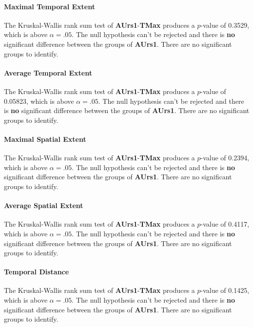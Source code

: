 \paragraph{Maximal Temporal Extent}
The Kruskal-Wallis rank sum test of \textbf{AUrs1}-\textbf{TMax} produces a $p$-value of 0.3529, which is above $\alpha=.05$. The null hypothesis can't be rejected and there is \textbf{no} significant difference between the groups of \textbf{AUrs1}. There are no significant groups to identify.

\paragraph{Average Temporal Extent}
The Kruskal-Wallis rank sum test of \textbf{AUrs1}-\textbf{TMax} produces a $p$-value of 0.05823, which is above $\alpha=.05$. The null hypothesis can't be rejected and there is \textbf{no} significant difference between the groups of \textbf{AUrs1}. There are no significant groups to identify.

\paragraph{Maximal Spatial Extent}
The Kruskal-Wallis rank sum test of \textbf{AUrs1}-\textbf{TMax} produces a $p$-value of 0.2394, which is above $\alpha=.05$. The null hypothesis can't be rejected and there is \textbf{no} significant difference between the groups of \textbf{AUrs1}. There are no significant groups to identify.

\paragraph{Average Spatial Extent}
The Kruskal-Wallis rank sum test of \textbf{AUrs1}-\textbf{TMax} produces a $p$-value of 0.4117, which is above $\alpha=.05$. The null hypothesis can't be rejected and there is \textbf{no} significant difference between the groups of \textbf{AUrs1}. There are no significant groups to identify.

\paragraph{Temporal Distance}
The Kruskal-Wallis rank sum test of \textbf{AUrs1}-\textbf{TMax} produces a $p$-value of 0.1425, which is above $\alpha=.05$. The null hypothesis can't be rejected and there is \textbf{no} significant difference between the groups of \textbf{AUrs1}. There are no significant groups to identify.

